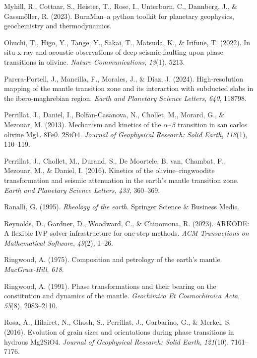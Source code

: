 \documentclass[draft,linenumbers]{agujournal2019}
\newlength{\cslhangindent}
\newenvironment{CSLReferences}[2]
 {\begin{list}{}{
  \setlength{\itemindent}{0pt}
  \setlength{\leftmargin}{0pt}
  \setlength{\parsep}{0pt}
  \ifodd #1
   \setlength{\leftmargin}{\cslhangindent}
   \setlength{\itemindent}{-\cslhangindent}
  \fi
  \setlength{\itemsep}{#2\baselineskip}
  }
  \item\relax}
 {\end{list}}
\begin{document}
\begin{CSLReferences}{1}{0}
Myhill, R., Cottaar, S., Heister, T., Rose, I., Unterborn, C., Dannberg,
J., \& Gassmöller, R. (2023). BurnMan--a python toolkit for planetary
geophysics, geochemistry and thermodynamics.

Ohuchi, T., Higo, Y., Tange, Y., Sakai, T., Matsuda, K., \& Irifune, T.
(2022). In situ x-ray and acoustic observations of deep seismic faulting
upon phase transitions in olivine. \emph{Nature Communications},
\emph{13}(1), 5213.

Parera-Portell, J., Mancilla, F., Morales, J., \& Díaz, J. (2024).
High-resolution mapping of the mantle transition zone and its
interaction with subducted slabs in the ibero-maghrebian region.
\emph{Earth and Planetary Science Letters}, \emph{640}, 118798.

Perrillat, J., Daniel, I., Bolfan-Casanova, N., Chollet, M., Morard, G.,
\& Mezouar, M. (2013). Mechanism and kinetics of the
\(\alpha\)--\(\beta\) transition in san carlos olivine Mg1. 8Fe0. 2SiO4.
\emph{Journal of Geophysical Research: Solid Earth}, \emph{118}(1),
110--119.

Perrillat, J., Chollet, M., Durand, S., De Moortele, B. van, Chambat,
F., Mezouar, M., \& Daniel, I. (2016). Kinetics of the
olivine--ringwoodite transformation and seismic attenuation in the
earth's mantle transition zone. \emph{Earth and Planetary Science
Letters}, \emph{433}, 360--369.

Ranalli, G. (1995). \emph{Rheology of the earth}. Springer Science \&
Business Media.

Reynolds, D., Gardner, D., Woodward, C., \& Chinomona, R. (2023).
ARKODE: A flexible IVP solver infrastructure for one-step methods.
\emph{ACM Transactions on Mathematical Software}, \emph{49}(2), 1--26.

Ringwood, A. (1975). Composition and petrology of the earth's mantle.
\emph{MacGraw-Hill}, \emph{618}.

Ringwood, A. (1991). Phase transformations and their bearing on the
constitution and dynamics of the mantle. \emph{Geochimica Et
Cosmochimica Acta}, \emph{55}(8), 2083--2110.

Rosa, A., Hilairet, N., Ghosh, S., Perrillat, J., Garbarino, G., \&
Merkel, S. (2016). Evolution of grain sizes and orientations during
phase transitions in hydrous Mg2SiO4. \emph{Journal of Geophysical
Research: Solid Earth}, \emph{121}(10), 7161--7176.


\end{CSLReferences}
\end{document}
